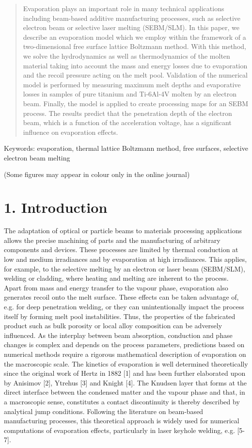\documentclass[10pt]{article}
\begin{document}
\begin{abstract}
Evaporation plays an important role in many technical applications including beam-based additive manufacturing processes, such as selective electron beam or selective laser melting (SEBM/SLM). In this paper, we describe an evaporation model which we employ within the framework of a two-dimensional free surface lattice Boltzmann method. With this method, we solve the hydrodynamics as well as thermodynamics of the molten material taking into account the mass and energy losses due to evaporation and the recoil pressure acting on the melt pool. Validation of the numerical model is performed by measuring maximum melt depths and evaporative losses in samples of pure titanium and Ti-6Al-4V molten by an electron beam. Finally, the model is applied to create processing maps for an SEBM process. The results predict that the penetration depth of the electron beam, which is a function of the acceleration voltage, has a significant influence on evaporation effects.
\end{abstract}

Keywords: evaporation, thermal lattice Boltzmann method, free surfaces, selective electron beam melting

(Some figures may appear in colour only in the online journal)

\section*{1. Introduction}
The adaptation of optical or particle beams to materials processing applications allows the precise machining of parts and the manufacturing of arbitrary components and devices. These processes are limited by thermal conduction at low and medium irradiances and by evaporation at high irradiances. This applies, for example, to the selective melting by an electron or laser beam (SEBM/SLM), welding or cladding, where heating and melting are inherent to the process. Apart from mass and energy transfer to the vapour phase, evaporation also generates recoil onto the melt surface. These effects can be taken advantage of, e.g. for deep penetration welding, or they can unintentionally impact the process itself by forming melt pool instabilities. Thus, the properties of the fabricated product such as bulk porosity or local alloy composition can be adversely influenced. As the interplay between beam absorption, conduction and phase changes is complex and depends on the process parameters, predictions based on numerical methods require a rigorous mathematical description of evaporation on the macroscopic scale. The kinetics of evaporation is well determined theoretically since the original work of Hertz in 1882 [1] and has been further elaborated upon by Anisimov [2], Ytrehus [3] and Knight [4]. The Knudsen layer that forms at the direct interface between the condensed matter and the vapour phase and that, in a macroscopic sense, constitutes a contact discontinuity is thereby described by analytical jump conditions. Following the literature on beam-based manufacturing processes, this theoretical approach is widely used for numerical computations of evaporation effects, particularly in laser keyhole welding, e.g. [5-7].
\end{document}
